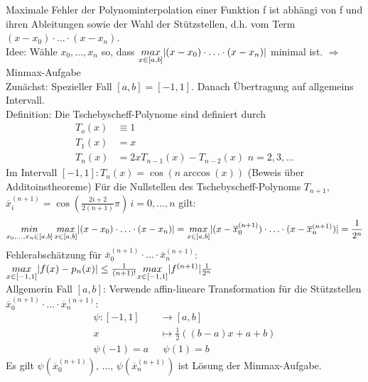 Maximale Fehler der Polynominterpolation einer Funktion f ist abhängi von f und ihren
Ableitungen sowie der Wahl der Stützstellen, d.h. vom Term
$(x - x_0)\cdot \ldots \cdot(x - x_n)$. \\
Idee: Wähle $x_0, \ldots, x_n$ so, dass $\underset{x \in [a, b]}{max} |(x - x_0)\cdot \ldots \cdot(x - x_n)|$
minimal ist. $\Rightarrow$ Minmax-Aufgabe \\
Zunächst: Spezieller Fall $[a, b] = [-1, 1]$. Danach Übertragung auf allgemeins
Intervall. \\
Definition: Die Tschebyscheff-Polynome sind definiert durch
\begin{align*}
  T_o(x) &\equiv 1\\
  T_1(x) &= x\\
  T_n(x) &= 2xT_{n-1}(x) - T_{n-2}(x)\,\, n = 2, 3, \ldots
\end{align*}
Im Intervall $[-1, 1]: T_n(x) = \cos(n\arccos(x))$ (Beweis über Additoinstheoreme)
 Für die Nullstellen des Tschebyscheff-Polynoms $T_{n+1}$, 
$\overline{x}_i^{(n+1)} = \cos(\frac{2i + 2}{2(n + 1)}\pi)\, i = 0, \ldots, n$ gilt:
\begin{align*}
  \underset{x_0, \ldots, x_n \in [a, b]}{min} \, \underset{x \in [a, b]}{max} |(x - x_0)
    \cdot \ldots \cdot(x - x_n)| = 
    \underset{x \in [a, b]}{max} |(x - \overline{x}_0^{(n + 1)})\cdot \ldots 
    \cdot(x - \overline{x}_n^{(n + 1)})| =\frac{1}{2^n}
\end{align*}
Fehlerabschätzung für 
$\overline{x}_0^{(n + 1)}\cdot \ldots \cdot\overline{x}_n^{(n + 1)}$: 
$\underset{x \in [-1, 1]}{max}|f(x) - p_n(x)| \leq \frac{1}{(n + 1)!} \underset{x \in [-1, 1]}{max} |f^{(n + 1)}| \frac{1}{2^n}$ \\
Allgemerin Fall $[a, b]$: Verwende affin-lineare Transformation für die Stützstellen
$\overline{x}_0^{(n + 1)}\cdot \ldots \cdot\overline{x}_n^{(n + 1)}$:
\begin{align*}
  \psi: [-1, 1] &\longrightarrow [a, b] \\
  x &\longmapsto \frac{1}{2}((b - a)x + a + b) \\
  \psi(-1) = a\,\,&\,\, \psi(1) = b
\end{align*}
Es gilt $\psi(\overline{x}_0^{(n + 1)}),\,\ldots,\,\psi(\overline{x}_n^{(n + 1)})$ ist
Lösung der Minmax-Aufgabe.


